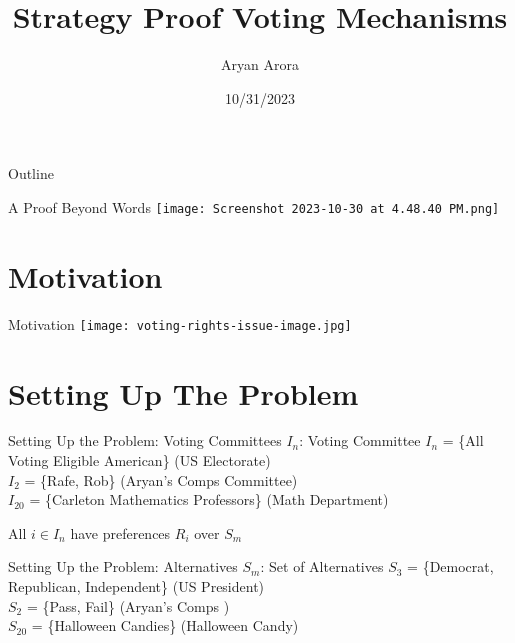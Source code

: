 \documentclass{beamer}
\title[Economics]{Strategy Proof Voting Mechanisms}
\author{Aryan Arora}
\institute{Carleton College}
\date{10/31/2023}
\begin{document}
\begin{frame}
  \titlepage
\end{frame}

\begin{frame}{Outline}
  \tableofcontents
\end{frame}

\begin{frame}{A Proof Beyond Words}
    \center \texttt{[image: Screenshot 2023-10-30 at 4.48.40 PM.png]}
\end{frame}

\section{Motivation}

\begin{frame}{Motivation}
    \center \texttt{[image: voting-rights-issue-image.jpg]}
\end{frame}

\section{Setting Up The Problem}

\begin{frame}{Setting Up the Problem: Voting Committees}
\huge
    $I_n$: Voting Committee
    \vskip 1cm
\large
    $I_n$ = \{All Voting Eligible American\} \hfill (US Electorate)\\ \vskip 0.5cm
    $I_2$ = \{Rafe, Rob\} \hfill (Aryan's Comps Committee)\\ \vskip 0.5cm
    $I_{20}$ = \{Carleton Mathematics Professors\} \hfill (Math Department)\\

    \vskip 1cm

    All $i \in I_n$ have preferences $R_i$ over $S_m$
    
\end{frame}

\begin{frame}{Setting Up the Problem: Alternatives}
\huge
    $S_m$: Set of Alternatives
    \vskip 1cm
\large
    $S_3$ = \{Democrat, Republican, Independent\} \hfill (US President)\\ \vskip 0.5cm
    $S_2$ = \{Pass, Fail\} \hfill (Aryan's Comps )\\ \vskip 0.5cm
    $S_{20}$ = \{Halloween Candies\} \hfill (Halloween Candy)\\
    
\end{frame}
\end{document}
